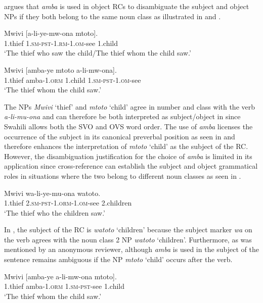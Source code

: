 \documentclass[output=paper,colorlinks,citecolor=brown]{langscibook}
\begin{document}
\citet[125--126]{Russell1992} argues that \textit{amba} is used in object RCs to disambiguate the subject and object NPs if they both belong to the same noun class as illustrated in  and .

\ea%
    \label{ex:mwamzandi:8}
    \gll    Mwivi [a-li-ye-mw-ona mtoto].\\
            1.thief  \textsc{1.sm-pst-1.rm-1.om-}see  1.child\\
    \glt    ‘The thief who saw the child/The thief whom the child saw.’
\z

\ea%
    \label{ex:mwamzandi:9}
    \gll    Mwivi [amba-ye mtoto a-li-mw-ona].\\
            1.thief  amba\textsc{-1.orm} 1.child \textsc{1.sm-pst-1.om-}see\\
    \glt    ‘The thief whom the child saw.’
\z

The NPs \textit{Mwivi} ‘thief’ and \textit{mtoto} ‘child’ agree in number and class with the verb \textit{a-li-mu-ona} and can therefore be both interpreted as subject/object in  since Swahili allows both the SVO and OVS word order. The use of \textit{amba} licenses the occurrence of the subject in its canonical preverbal position as seen in  and therefore enhances the interpretation of \textit{mtoto} ‘child’ as the subject of the RC. However, the disambiguation justification for the choice of \textit{amba} is limited in its application since cross-reference can establish the subject and object grammatical roles in situations where the two belong to different noun classes as seen in .

\ea%
    \label{ex:mwamzandi:10}
    \gll    Mwivi wa-li-ye-mu-ona watoto.\\
            1.thief  \textsc{2.sm-pst-1.orm-1.om-}see 2.children\\
    \glt    ‘The thief who the children saw.’
\z

In , the subject of the RC is \textit{watoto} ‘children’ because the subject marker \textit{wa} on the verb agrees with the noun class 2 NP \textit{watoto} ‘children’. Furthermore, as was mentioned by an anonymous reviewer, although \textit{amba} is used in  the subject of the sentence remains ambiguous if the NP \textit{mtoto} ‘child’ occurs after the verb.

\ea%
    \label{ex:mwamzandi:11}
    \gll    Mwivi [amba-ye a-li-mw-ona mtoto].\\
            1.thief  amba\textsc{-1.orm} \textsc{1.sm-pst-}see 1.child\\
    \glt    ‘The thief whom the child saw.’
\z
\end{document}

